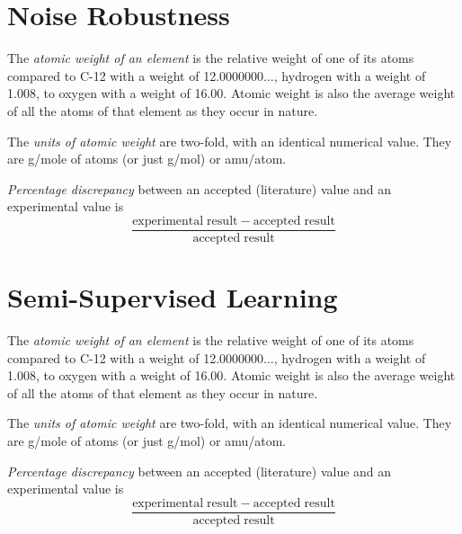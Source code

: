 \documentclass{article}
\begin{document}

\section{Noise Robustness}

\begin{enumerate}
\begin{item}
The \emph{atomic weight of an element} is the relative weight of one of its atoms compared to C-12 with a weight of 12.0000000$\ldots$, hydrogen with a weight of 1.008, to oxygen with a weight of 16.00. Atomic weight is also the average weight of all the atoms of that element as they occur in nature.
\end{item}
\begin{item}
The \emph{units of atomic weight} are two-fold, with an identical numerical value. They are g/mole of atoms (or just g/mol) or amu/atom.
\end{item}
\begin{item}
\emph{Percentage discrepancy} between an accepted (literature) value and an experimental value is
\begin{equation*}
\frac{\mathrm{experimental\;result} - \mathrm{accepted\;result}}{\mathrm{accepted\;result}}
\end{equation*}
\end{item}
\end{enumerate}



\section{Semi-Supervised Learning}

\begin{enumerate}
\begin{item}
The \emph{atomic weight of an element} is the relative weight of one of its atoms compared to C-12 with a weight of 12.0000000$\ldots$, hydrogen with a weight of 1.008, to oxygen with a weight of 16.00. Atomic weight is also the average weight of all the atoms of that element as they occur in nature.
\end{item}
\begin{item}
The \emph{units of atomic weight} are two-fold, with an identical numerical value. They are g/mole of atoms (or just g/mol) or amu/atom.
\end{item}
\begin{item}
\emph{Percentage discrepancy} between an accepted (literature) value and an experimental value is
\begin{equation*}
\frac{\mathrm{experimental\;result} - \mathrm{accepted\;result}}{\mathrm{accepted\;result}}
\end{equation*}
\end{item}
\end{enumerate}
\end{document}
